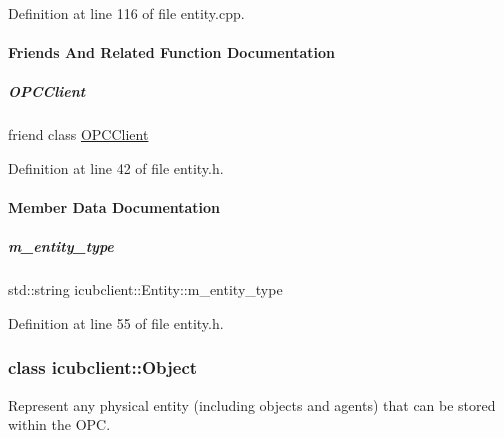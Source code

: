 Definition at line 116 of file entity.\+cpp.



\paragraph{Friends And Related Function Documentation}
\mbox{\label{group__icubclient__representations_a80f0caa9925206967111a3d2713874a2}} 
\subparagraph{\texorpdfstring{O\+P\+C\+Client}{OPCClient}}
{\footnotesize\ttfamily friend class \hyperlink{group__icubclient__clients_classicubclient_1_1OPCClient}{O\+P\+C\+Client}\hspace{0.3cm}{\ttfamily [friend]}}



Definition at line 42 of file entity.\+h.



\paragraph{Member Data Documentation}
\mbox{\label{group__icubclient__representations_a4e8debb6585287440c3e04d07628ee36}} 
\subparagraph{\texorpdfstring{m\+\_\+entity\+\_\+type}{m\_entity\_type}}
{\footnotesize\ttfamily std\+::string icubclient\+::\+Entity\+::m\+\_\+entity\+\_\+type\hspace{0.3cm}{\ttfamily [protected]}}



Definition at line 55 of file entity.\+h.

\label{classicubclient_1_1Object}
\subsubsection{class icubclient\+:\+:Object}
Represent any physical entity (including objects and agents) that can be stored within the O\+PC. 

